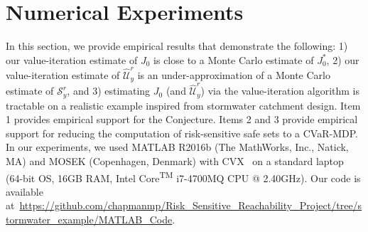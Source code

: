 \documentclass[letterpaper, 10 pt, conference]{ieeeconf}  %
\begin{document}
\section{Numerical Experiments}\label{sec::ex}
In this section, we provide empirical results that demonstrate the following: 1) our value-iteration estimate of $J_0$ is close to a Monte Carlo estimate of $J_0^*$,
2) our value-iteration estimate of $\widehat{\mathcal{U}}_y^r$ is an under-approximation of a Monte Carlo estimate of $\mathcal{S}_y^r$, and
3) estimating $J_0$ (and $\widehat{\mathcal{U}}_y^r$) via the value-iteration algorithm is tractable on a
realistic example inspired from stormwater catchment design.
Item 1 provides empirical support for the Conjecture. Items 2 and 3 provide empirical support for 
reducing the computation of risk-sensitive safe sets to a CVaR-MDP.
In our experiments, we used MATLAB R2016b (The MathWorks, Inc., Natick, MA) and MOSEK (Copenhagen, Denmark) with CVX~\cite{grant2008cvx} on a
standard laptop (64-bit OS, 16GB RAM, Intel\textsuperscript{\textregistered} Core\textsuperscript{TM} i7-4700MQ CPU @ 2.40GHz).
Our code is available at~\url{https://github.com/chapmanmp/Risk_Sensitive_Reachability_Project/tree/stormwater_example/MATLAB_Code}.
\end{document}

